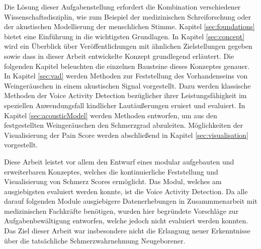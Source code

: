 Die Lösung dieser Aufgabenstellung erfordert die Kombination verschiedener Wissenschaftsdisziplin, wie zum Beispiel der medizinischen Schreiforschung oder der akustischen Modellierung der menschlichen Stimme. Kapitel \ref{sec:foundations} bietet eine Einführung in die wichtigsten Grundlagen. In Kapitel \ref{sec:concept} wird ein Überblick über Veröffentlichungen mit ähnlichen Zielstellungen gegeben sowie dass in dieser Arbeit entwickelte Konzept grundlegend erläutert. Die folgenden Kapitel beleuchten die einzelnen Bausteine dieses Konzeptes genauer. In Kapitel \ref{sec:vad} werden Methoden zur Feststellung des Vorhandenseins von Weingeräuschen in einem akustischen Signal vorgestellt. Dazu werden klassische Methoden der Voice Activity Detection bezüglicher ihrer Leistungsfähigkeit im speziellen Anwendungsfall kindlicher Lautäußerungen eruiert und evaluiert. In Kapitel \ref{sec:acousticModel} werden Methoden entworfen, um aus den festgestellten Weingeräuschen den Schmerzgrad abzuleiten. Möglichkeiten der Visualisierung der Pain Score werden abschließend in Kapitel \ref{sec:visualisation} vorgestellt.

Diese Arbeit leistet vor allem den Entwurf eines modular aufgebauten und erweiterbaren Konzeptes, welches die kontinuierliche Feststellung und Visualisierung von Schmerz Scores ermöglicht. Das Modul, welches am ausgiebigsten evaluiert werden konnte, ist die Voice Activity Detection. Da alle darauf folgenden Module ausgiebigere Datenerhebungen in Zusammmenarbeit mit medizinischen Fachkräfte benötigen, wurden hier begründete Vorschläge zur Aufgabenbewältigung entworfen, welche jedoch nicht evaluiert werden konnten. Das Ziel dieser Arbeit war insbesondere nicht die Erlangung neuer Erkenntnisse über die tatsächliche Schmerzwahrnehmung Neugeborener.